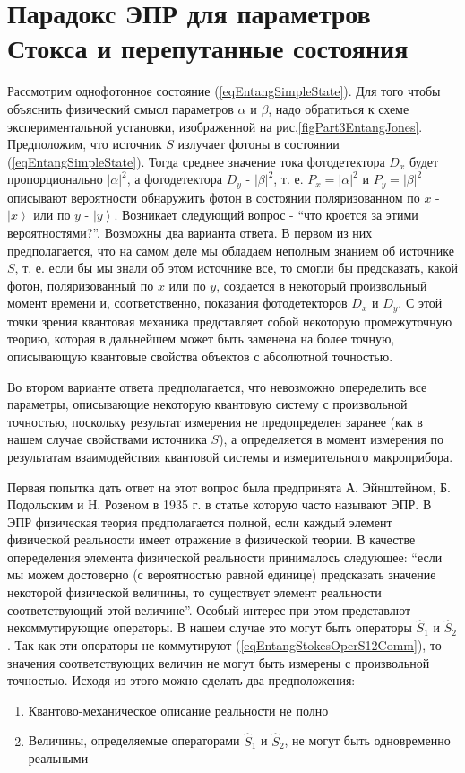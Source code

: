 \section{Парадокс ЭПР для параметров
  Стокса и перепутанные состояния}

Рассмотрим однофотонное состояние (\ref{eqEntangSimpleState}). 
Для того чтобы объяснить
физический смысл параметров $\alpha$ и $\beta$, надо обратиться к схеме
экспериментальной установки, изображенной на
рис.\ref{figPart3EntangJones}. Предположим, что источник $S$ излучает
фотоны в состоянии (\ref{eqEntangSimpleState}). Тогда среднее значение
тока фотодетектора $D_x$ будет пропорционально
$\left|\alpha\right|^2$, а фотодетектора $D_y$ -
$\left|\beta\right|^2$, т. е. $P_x = \left|\alpha\right|^2$ и $P_y =
\left|\beta\right|^2$ описывают вероятности обнаружить фотон в
состоянии поляризованном по $x$ - $\left|x\right>$ или по $y$ -
$\left|y\right>$. Возникает следующий вопрос - ``что кроется за этими
вероятностями?''. Возможны два варианта ответа. В первом из них
предполагается, что на самом деле мы обладаем неполным знанием об источнике $S$,
т. е. если бы мы знали об этом источнике все, то смогли бы
предсказать, какой фотон, поляризованный по $x$ или по $y$, создается в
некоторый произвольный момент времени и, соответственно, показания
фотодетекторов $D_x$ и $D_y$. С этой точки зрения
квантовая механика представляет собой некоторую промежуточную
теорию, которая в дальнейшем может быть заменена на более точную,
описывающую квантовые свойства объектов с абсолютной точностью. 

Во втором варианте ответа предполагается, что невозможно опеределить
все параметры, описывающие некоторую квантовую систему с произвольной
точностью, поскольку результат измерения не предопределен заранее (как
в нашем случае свойствами источника $S$), а определяется в момент
измерения по результатам взаимодействия квантовой системы и
измерительного макроприбора. 

Первая попытка дать ответ на этот вопрос была предпринята 
А. Эйнштейном, Б. Подольским и Н. Розеном в 1935 г. в статье которую
часто называют ЭПР\cite{bEPR}. В ЭПР физическая теория предполагается
полной, если каждый элемент физической реальности имеет отражение в
физической теории. В качестве опеределения элемента физической
реальности принималось следующее: ``если мы можем достоверно (с
вероятностью равной единице) предсказать значение некоторой физической
величины, то существует элемент реальности соответствующий этой
величине''\cite{bBelokTimHrus}. Особый интерес при этом представлют
некоммутирующие операторы. В нашем случае это могут быть операторы
$\hat{S}_1$ и $\hat{S}_2$. Так как эти операторы не коммутируют
(\ref{eqEntangStokesOperS12Comm}), то
значения соответствующих величин не могут быть измерены с произвольной
точностью. Исходя из этого можно сделать два предположения:
\begin{enumerate}
\item Квантово-механическое описание реальности не полно
\item Величины, определяемые операторами $\hat{S}_1$ и $\hat{S}_2$, не
  могут быть одновременно реальными
\end{enumerate}

